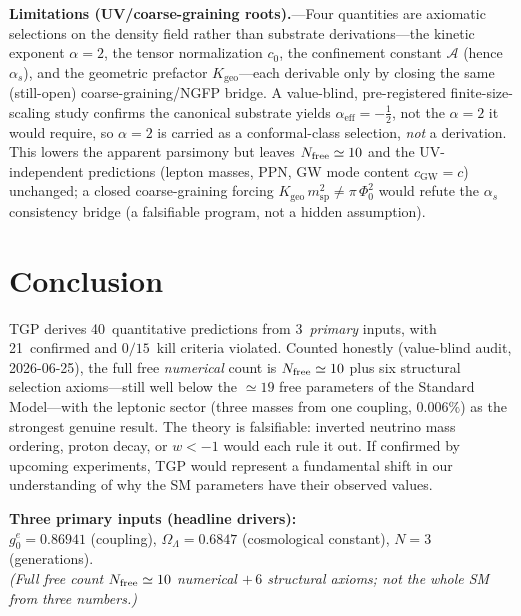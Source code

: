 \documentclass[aps,prl,twocolumn,superscriptaddress,showpacs,floatfix]{revtex4-2}
\newcommand{\gone}{{g_0^e}}
\newcommand{\OL}{\Omega_\Lambda}
\newcommand{\as}{\alpha_s}
\newcommand{\PhiZero}{\Phi_0}
\begin{document}
\medskip\noindent
\textbf{Limitations (UV/coarse-graining roots).}---Four quantities are
axiomatic selections on the density field rather than substrate
derivations---the kinetic exponent $\alpha = 2$, the tensor normalization
$c_0$, the confinement constant $\mathcal{A}$ (hence $\as$), and the
geometric prefactor $K_\mathrm{geo}$---each derivable only by closing the
same (still-open) coarse-graining/NGFP bridge.
A value-blind, pre-registered finite-size-scaling study confirms the
canonical substrate yields $\alpha_\mathrm{eff} = -\tfrac12$, not the
$\alpha = 2$ it would require, so $\alpha = 2$ is carried as a
conformal-class selection, \emph{not} a derivation.
This lowers the apparent parsimony but leaves $N_{\rm free}\simeq 10$ and the
UV-independent predictions (lepton masses, PPN, GW mode content
$c_\mathrm{GW}=c$) unchanged; a closed coarse-graining forcing
$K_\mathrm{geo}\,m_\mathrm{sp}^2\neq\pi\,\PhiZero^2$ would refute the
$\as$ consistency bridge (a falsifiable program, not a hidden assumption).


\section{Conclusion}

TGP derives 40~quantitative predictions from 3~\emph{primary} inputs,
with 21~confirmed and $0/15$~kill criteria violated.
Counted honestly (value-blind audit, 2026-06-25), the full free
\emph{numerical} count is $N_{\rm free}\simeq 10$ plus six structural
selection axioms---still well below the $\simeq 19$ free parameters of
the Standard Model---with the leptonic sector (three masses from one
coupling, $0.006\%$) as the strongest genuine result.
The theory is falsifiable: inverted neutrino mass ordering, proton decay,
or $w < -1$ would each rule it out.
If confirmed by upcoming experiments, TGP would represent a fundamental
shift in our understanding of why the SM parameters have their observed
values.

\medskip\noindent
\textbf{Three primary inputs (headline drivers):}\\
$\gone = 0.86941$ (coupling),
$\OL = 0.6847$ (cosmological constant),
$N = 3$ (generations).\\
\emph{(Full free count $N_{\rm free}\simeq 10$ numerical $+\,6$ structural
axioms; not the whole SM from three numbers.)}


\begin{acknowledgments}
[TBD]
\end{acknowledgments}
\end{document}
